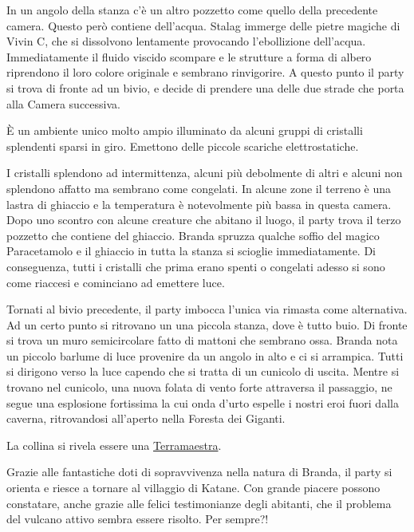 In un angolo della stanza c'è un altro pozzetto come quello della
precedente camera. Questo però contiene dell'acqua. Stalag immerge delle
pietre magiche di Vivin C, che si dissolvono lentamente provocando
l'ebollizione dell'acqua. Immediatamente il fluido viscido scompare e le
strutture a forma di albero riprendono il loro colore originale e
sembrano rinvigorire. A questo punto il party si trova di fronte ad un
bivio, e decide di prendere una delle due strade che porta alla Camera
successiva.

È un ambiente unico molto ampio illuminato da alcuni gruppi di cristalli
splendenti sparsi in giro. Emettono delle piccole scariche
elettrostatiche.

I cristalli splendono ad intermittenza, alcuni più debolmente di altri e
alcuni non splendono affatto ma sembrano come congelati. In alcune zone
il terreno è una lastra di ghiaccio e la temperatura è notevolmente più
bassa in questa camera. Dopo uno scontro con alcune creature che abitano
il luogo, il party trova il terzo pozzetto che contiene del ghiaccio.
Branda spruzza qualche soffio del magico Paracetamolo e il ghiaccio in
tutta la stanza si scioglie immediatamente. Di conseguenza, tutti i
cristalli che prima erano spenti o congelati adesso si sono come
riaccesi e cominciano ad emettere luce.

Tornati al bivio precedente, il party imbocca l'unica via rimasta come
alternativa. Ad un certo punto si ritrovano un una piccola stanza, dove
è tutto buio. Di fronte si trova un muro semicircolare fatto di mattoni
che sembrano ossa. Branda nota un piccolo barlume di luce provenire da
un angolo in alto e ci si arrampica. Tutti si dirigono verso la luce
capendo che si tratta di un cunicolo di uscita. Mentre si trovano nel
cunicolo, una nuova folata di vento forte attraversa il passaggio, ne
segue una esplosione fortissima la cui onda d'urto espelle i nostri eroi
fuori dalla caverna, ritrovandosi all'aperto nella Foresta dei Giganti.

La collina si rivela essere una
\href{Terramaestra\%207baa6c3cd73e483fb4ade190a1dc230e.md}{Terramaestra}.

Grazie alle fantastiche doti di sopravvivenza nella natura di Branda, il
party si orienta e riesce a tornare al villaggio di Katane. Con grande
piacere possono constatare, anche grazie alle felici testimonianze degli
abitanti, che il problema del vulcano attivo sembra essere risolto. Per
sempre?!
